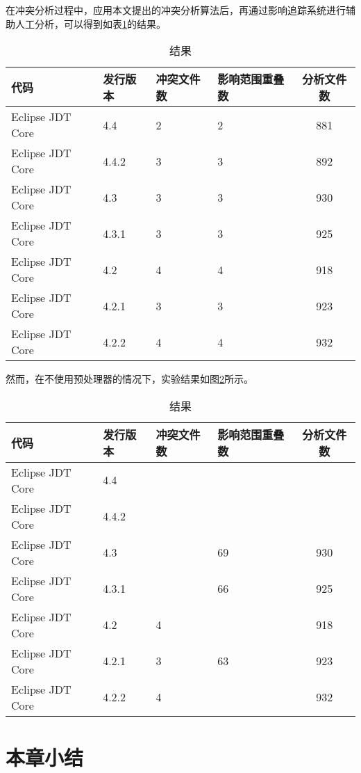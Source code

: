 在冲突分析过程中，应用本文提出的冲突分析算法后，再通过影响追踪系统进行辅助人工分析，可以得到如表\ref {data_compatible}的结果。

\begin{table}[H]
	\caption{结果}
	\label{data_compatible}
	\centering
	\begin{tabular}{llllc}
		\toprule[1.5pt]
		{\heiti 代码} & {\heiti 发行版本} & {\heiti 冲突文件数} & {\heiti 影响范围重叠数} & {\heiti 分析文件数} \\\midrule[1pt]
		Eclipse JDT Core & 4.4 	& 2 & 2 & 881\\
		Eclipse JDT Core & 4.4.2 & 3 & 3 & 892\\
		Eclipse JDT Core & 4.3 	& 3 & 3 & 930\\
		Eclipse JDT Core & 4.3.1 & 3 & 3 & 925\\
		Eclipse JDT Core & 4.2 	& 4 & 4 & 918\\
		Eclipse JDT Core & 4.2.1 & 3  &	3 & 923\\
		Eclipse JDT Core & 4.2.2 & 4 & 4 & 932\\
		\bottomrule[1.5pt]
	\end{tabular}
\end{table}

然而，在不使用预处理器的情况下，实验结果如图\ref {data_compatible_2}所示。

\begin{table}[H]
	\caption{结果}
	\label{data_compatible_2}
	\centering
	\begin{tabular}{llllc}
		\toprule[1.5pt]
		{\heiti 代码} & {\heiti 发行版本} & {\heiti 冲突文件数} & {\heiti 影响范围重叠数} & {\heiti 分析文件数} \\\midrule[1pt]
		Eclipse JDT Core & 4.4 			\\
		Eclipse JDT Core & 4.4.2 		\\
		Eclipse JDT Core & 4.3 	& & 69 & 930 \\
		Eclipse JDT Core & 4.3.1 & & 66 & 925\\
		Eclipse JDT Core & 4.2 	& 4 & & 918	\\
		Eclipse JDT Core & 4.2.1 & 3 & 63 & 923\\
		Eclipse JDT Core & 4.2.2 & 4 &  & 932\\
		\bottomrule[1.5pt]
	\end{tabular}
\end{table}


\section{本章小结}